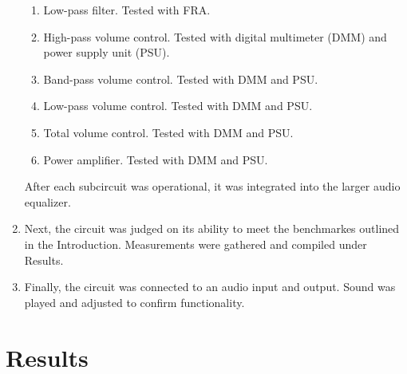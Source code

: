 \documentclass[notitlepage, 12pt]{report}
\begin{document}
\begin{enumerate}
\begin{enumerate}
        \item Low-pass filter. Tested with FRA. 
        \item High-pass volume control. Tested with digital multimeter (DMM) and power supply unit (PSU). 
        \item Band-pass volume control. Tested with DMM and PSU. 
        \item Low-pass volume control. Tested with DMM and PSU. 
        \item Total volume control. Tested with DMM and PSU. 
        \item Power amplifier. Tested with DMM and PSU. 
    \end{enumerate}
    After each subcircuit was operational, it was integrated into the larger 
    audio equalizer. 
    \item Next, the circuit was judged on its ability to meet the benchmarkes outlined in the Introduction. 
    Measurements were gathered and compiled under Results. 
    \item Finally, the circuit was connected to an audio input and output. Sound was played
    and adjusted to confirm functionality. 
\end{enumerate}

\pagebreak

\section*{Results}
\end{document}
